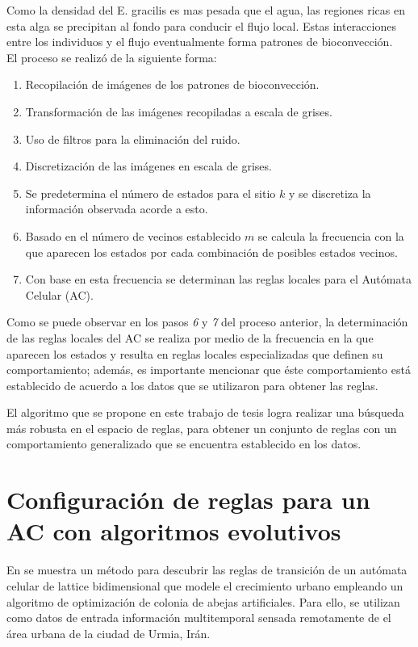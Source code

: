 Como la densidad del E. gracilis es mas pesada que el agua, las regiones ricas en esta alga se precipitan al fondo para conducir el flujo local. Estas interacciones entre los individuos y el flujo eventualmente forma patrones de bioconvección.
\\

El proceso se realizó de la siguiente forma:

\begin{enumerate}
	\item Recopilación de imágenes de los patrones de bioconvección.
	\item Transformación de las imágenes recopiladas a escala de grises.
	\item Uso de filtros para la eliminación del ruido.
	\item Discretización de las imágenes en escala de grises.
	\item Se predetermina el número de estados para el sitio $k$ y se discretiza la información observada acorde a esto.
	\item Basado en el número de vecinos establecido $m$ se calcula la frecuencia con la que aparecen los estados por cada combinación de posibles estados vecinos.
	\item Con base en esta frecuencia se determinan las reglas locales para el Autómata Celular (AC).
\end{enumerate}


Como se puede observar en los pasos \emph{6} y \emph{7} del proceso anterior, la determinación de las reglas locales del AC se realiza por medio de la frecuencia en la que aparecen los estados y resulta en reglas locales especializadas que definen su comportamiento; además, es importante mencionar que éste comportamiento está establecido de acuerdo a los datos que se utilizaron para obtener las reglas.


El algoritmo que se propone en este trabajo de tesis logra realizar una búsqueda más robusta en el espacio de reglas, para obtener un conjunto de reglas con un comportamiento generalizado que se encuentra establecido en los datos.

\section{Configuración de reglas para un AC con algoritmos evolutivos}

En \cite{naghibi2016discovery} se muestra un método para descubrir las reglas de transición de un autómata celular de lattice bidimensional que modele el crecimiento urbano empleando un algoritmo de optimización de colonia de abejas artificiales. Para ello, se utilizan como datos de entrada información multitemporal sensada remotamente de el área urbana de la ciudad de Urmia, Irán.
\\

